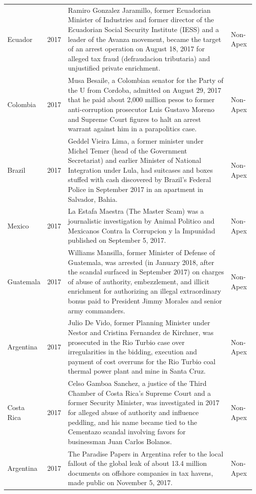 \begin{landscape}
\begin{longtable}{@{}l c p{15.5cm} l@{}}
Ecuador & 2017 & Ramiro Gonzalez Jaramillo, former Ecuadorian Minister of Industries and former director of the Ecuadorian Social Security Institute (IESS) and a leader of the Avanza movement, became the target of an arrest operation on August 18, 2017 for alleged tax fraud (defraudacion tributaria) and unjustified private enrichment. & Non-Apex \\
Colombia & 2017 & Musa Besaile, a Colombian senator for the Party of the U from Cordoba, admitted on August 29, 2017 that he paid about 2,000 million pesos to former anti-corruption prosecutor Luis Gustavo Moreno and Supreme Court figures to halt an arrest warrant against him in a parapolitics case. & Non-Apex \\
Brazil & 2017 & Geddel Vieira Lima, a former minister under Michel Temer (head of the Government Secretariat) and earlier Minister of National Integration under Lula, had suitcases and boxes stuffed with cash discovered by Brazil's Federal Police in September 2017 in an apartment in Salvador, Bahia. & Non-Apex \\
Mexico & 2017 & La Estafa Maestra (The Master Scam) was a journalistic investigation by Animal Politico and Mexicanos Contra la Corrupcion y la Impunidad published on September 5, 2017. & Non-Apex \\
Guatemala & 2017 & Williams Mansilla, former Minister of Defense of Guatemala, was arrested (in January 2018, after the scandal surfaced in September 2017) on charges of abuse of authority, embezzlement, and illicit enrichment for authorizing an illegal extraordinary bonus paid to President Jimmy Morales and senior army commanders. & Non-Apex \\
Argentina & 2017 & Julio De Vido, former Planning Minister under Nestor and Cristina Fernandez de Kirchner, was prosecuted in the Rio Turbio case over irregularities in the bidding, execution and payment of cost overruns for the Rio Turbio coal thermal power plant and mine in Santa Cruz. & Non-Apex \\
Costa Rica & 2017 & Celso Gamboa Sanchez, a justice of the Third Chamber of Costa Rica's Supreme Court and a former Security Minister, was investigated in 2017 for alleged abuse of authority and influence peddling, and his name became tied to the Cementazo scandal involving favors for businessman Juan Carlos Bolanos. & Non-Apex \\
Argentina & 2017 & The Paradise Papers in Argentina refer to the local fallout of the global leak of about 13.4 million documents on offshore companies in tax havens, made public on November 5, 2017. & Non-Apex \\

\end{longtable}
\end{landscape}
